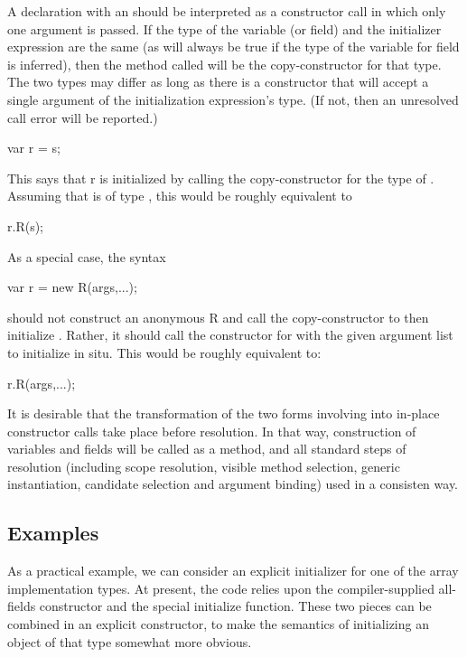 A declaration with an  should be interpreted as a constructor call
in which only one argument is passed.  If the type of the variable (or field) and the initializer
expression are the same (as will always be true if the type of the variable for field is
inferred), then the method called will be the copy-constructor for that type.  The two
types may differ as long as there is a constructor that will accept a single argument of
the initialization expression's type.  (If not, then an unresolved call error will be
reported.)
\begin{chapel}
var r = s;
\end{chapel}
This says that r is initialized by calling the copy-constructor for the type of .
Assuming that  is of type , this would be roughly equivalent to
\begin{chapel}
r.R(s);
\end{chapel}

As a special case, the syntax
\begin{chapel}
var r = new R(args,...);
\end{chapel}
should not construct an anonymous R and call the copy-constructor to then initialize
.  Rather, it should call the constructor for  with the given argument
list to initialize  in situ.  This would be roughly equivalent to:
\begin{chapel}
r.R(args,...);
\end{chapel}

It is desirable that the transformation of the two forms involving \chpl{=} into in-place
constructor calls take place before resolution.  In that way, construction of variables
and fields will be called as a method, and all standard steps of resolution (including
scope resolution, visible method selection, generic instantiation, candidate selection and
argument binding) used in a consisten way.

\subsection{Examples}

As a practical example, we can consider an explicit initializer for one of the array
implementation types.  At present, the code relies upon the compiler-supplied all-fields
constructor and the special initialize function.  These two pieces can be combined in an
explicit constructor, to make the semantics of initializing an object of that type
somewhat more obvious.

